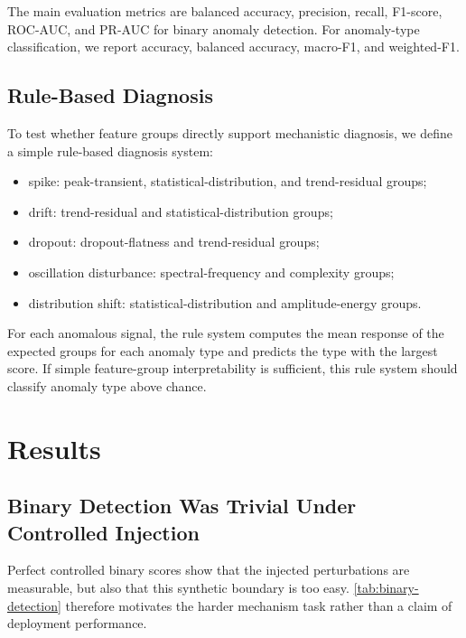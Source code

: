 The main evaluation metrics are balanced accuracy, precision, recall, F1-score, ROC-AUC, and PR-AUC for binary anomaly detection. For anomaly-type classification, we report accuracy, balanced accuracy, macro-F1, and weighted-F1.

\subsection{Rule-Based Diagnosis}

To test whether feature groups directly support mechanistic diagnosis, we define a simple rule-based diagnosis system:

\begin{itemize}
    \item spike: peak-transient, statistical-distribution, and trend-residual groups;
    \item drift: trend-residual and statistical-distribution groups;
    \item dropout: dropout-flatness and trend-residual groups;
    \item oscillation disturbance: spectral-frequency and complexity groups;
    \item distribution shift: statistical-distribution and amplitude-energy groups.
\end{itemize}

For each anomalous signal, the rule system computes the mean response of the expected groups for each anomaly type and predicts the type with the largest score. If simple feature-group interpretability is sufficient, this rule system should classify anomaly type above chance.

\section{Results}

\subsection{Binary Detection Was Trivial Under Controlled Injection}

Perfect controlled binary scores show that the injected perturbations are measurable, but also that this synthetic boundary is too easy. \cref{tab:binary-detection} therefore motivates the harder mechanism task rather than a claim of deployment performance.

